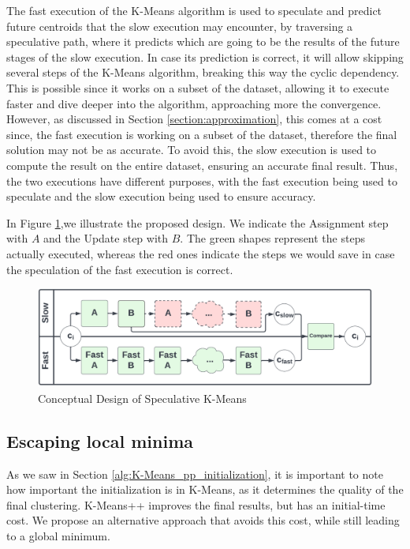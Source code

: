 The fast execution of the K-Means algorithm is used to speculate and predict future centroids that the slow execution may encounter, by traversing a speculative path, where it predicts which are going to be the results of the future stages of the slow execution. In case its prediction is correct, it will allow skipping several steps of the K-Means algorithm, breaking this way the cyclic dependency. This is possible since it works on a subset of the dataset, allowing it to execute faster and dive deeper into the algorithm, approaching more the convergence. However, as discussed in Section \ref{section:approximation}, this comes at a cost since, the fast execution is working on a subset of the dataset, therefore the final solution may not be as accurate. To avoid this, the slow execution is used to compute the result on the entire dataset, ensuring an accurate final result. Thus, the two executions have different purposes, with the fast execution being used to speculate and the slow execution being used to ensure accuracy.

In Figure \ref{fig:speculation_conceptual_design},we illustrate the proposed design. We indicate the Assignment step with $A$ and the Update step with $B$. The green shapes represent the steps actually executed, whereas the red ones indicate the steps we would save in case the speculation of the fast execution is correct. 

\begin{figure}[h]
\centering
\includegraphics[width=\linewidth]{./plots/speculative_KMeans_conceptual_design.png}
\caption{Conceptual Design of Speculative K-Means}
\label{fig:speculation_conceptual_design}
\end{figure}


\subsection{Escaping local minima}

As we saw in Section \ref{alg:K-Means_pp_initialization}, it is important to note how important the initialization is in K-Means, as it determines the quality of the final clustering. K-Means++ improves the final results, but has an initial-time cost. We propose an alternative approach that avoids this cost, while still leading to a global minimum.

